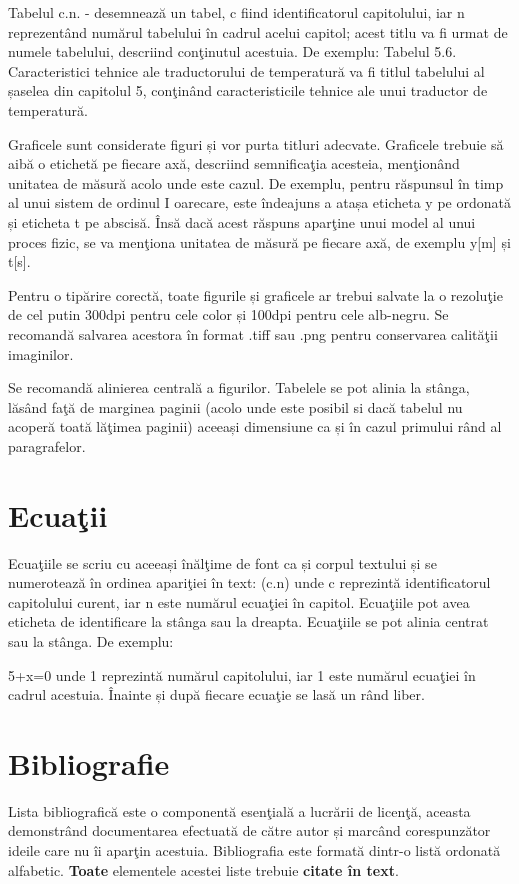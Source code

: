 	Tabelul c.n. - desemnează un tabel, c fiind identificatorul capitolului, iar n reprezentând numărul tabelului în cadrul acelui capitol; acest titlu va fi urmat de numele tabelului, descriind conţinutul acestuia. De exemplu: Tabelul 5.6. Caracteristici tehnice ale traductorului de temperatură va fi titlul tabelului al șaselea din capitolul 5, conţinând caracteristicile tehnice ale unui traductor de temperatură.

	Graficele sunt considerate figuri și vor purta titluri adecvate. Graficele trebuie să aibă o etichetă pe fiecare axă, descriind semnificaţia acesteia, menţionând unitatea de măsură acolo unde este cazul. De exemplu, pentru răspunsul în timp al unui sistem de ordinul I oarecare, este îndeajuns a atașa eticheta y pe ordonată și eticheta t pe abscisă. Însă dacă acest răspuns aparţine unui model al unui proces fizic, se va menţiona unitatea de măsură pe fiecare axă, de exemplu y[m] și t[s].

	Pentru o tipărire corectă, toate figurile și graficele ar trebui salvate la o rezoluţie de cel putin 300dpi pentru cele color și 100dpi pentru cele alb-negru. Se recomandă salvarea acestora în format .tiff sau .png pentru conservarea calităţii imaginilor.

	Se recomandă alinierea centrală a figurilor. Tabelele se pot alinia la stânga, lăsând faţă de marginea paginii (acolo unde este posibil si dacă tabelul nu acoperă toată lăţimea paginii) aceeași dimensiune ca și în cazul primului rând al paragrafelor.

\section{Ecuaţii}

	Ecuaţiile se scriu cu aceeași înălţime de font ca și corpul textului și se numerotează în ordinea apariţiei în text: (c.n) unde c reprezintă identificatorul capitolului curent, iar n este numărul ecuaţiei în capitol. Ecuaţiile pot avea eticheta de identificare la stânga sau la dreapta. Ecuaţiile se pot alinia centrat sau la stânga. De exemplu:

\be
\label{eq:test}
5+x=0
\ee
unde 1 reprezintă numărul capitolului, iar 1 este numărul ecuaţiei în cadrul acestuia. Înainte și după fiecare ecuaţie se lasă un rând liber.


\section{Bibliografie}

	Lista bibliografică este o componentă esenţială a lucrării de licenţă, aceasta demonstrând documentarea efectuată de către autor și marcând corespunzător ideile care nu îi aparţin acestuia. Bibliografia este formată dintr-o listă ordonată alfabetic. \textbf{Toate} elementele acestei liste trebuie \textbf{citate în text}.


